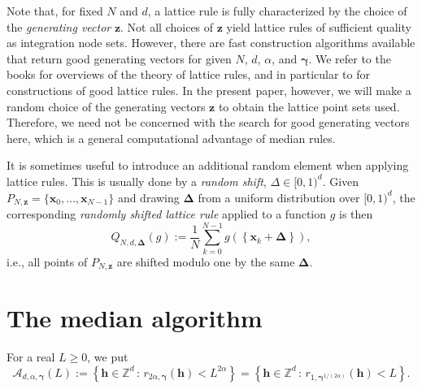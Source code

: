 \documentclass[a4paper,11pt]{article}
\newcommand{\bsh}{\boldsymbol{h}}
\newcommand{\bsx}{\boldsymbol{x}}
\newcommand{\bsz}{\boldsymbol{z}}
\newcommand{\bsgamma}{\boldsymbol{\gamma}}
\newcommand{\bsDelta}{\boldsymbol{\Delta}}
\newcommand{\ZZ}{\mathbb{Z}}
\newcommand{\Acal}{\mathcal{A}}
\begin{document}
Note that, for fixed $N$ and $d$, a lattice rule is fully characterized by the choice of the \textit{generating vector} $\bsz$. Not all choices of $\bsz$ yield lattice rules of sufficient quality as integration node sets. However, there are fast construction algorithms available that return good generating vectors for given $N$, $d$, $\alpha$, and $\bsgamma$. We refer to the books \cite{DKP22, SJ94} for overviews of the theory of lattice rules, and in particular to \cite[Chapters 3 and 4]{DKP22} for constructions of good lattice rules. In the present paper, however, we will make a random choice of the generating vectors $\bsz$ to obtain the lattice point sets used. Therefore, we need not be concerned with the search for good generating vectors here, which is a general computational advantage of median rules. 

It is sometimes useful to introduce an additional random element when applying lattice rules. This is usually done by a \emph{random shift}, $\Delta\in [0,1)^d$. Given $P_{N,\bsz}=\{\bsx_0,\ldots,\bsx_{N-1}\}$ and drawing $\bsDelta$ from a uniform distribution over $[0,1)^d$, the corresponding \emph{randomly shifted lattice rule} applied to a function $g$ is then 
\[
   Q_{N,d,\bsDelta}(g):=\frac{1}{N}\sum_{k=0}^{N-1}g \left(\left\{\bsx_k + \bsDelta\right\}\right),
\]
i.e., all points of $P_{N,\bsz}$ are shifted modulo one by the same $\bsDelta$.


\section{The median algorithm}\label{sec:median}

For a real $L\geq 0$, we put 
\begin{equation}\label{eq:Acal}
\Acal_{d,\alpha,\bsgamma}(L) := \left\{ \bsh \in \ZZ^d \,:\,  r_{2\alpha, \bsgamma}(\bsh) < L^{2\alpha} \right\}=\left\{ \bsh \in \ZZ^d \,:\,  r_{1, \bsgamma^{1/(2\alpha)}}(\bsh) < L\right\}.
\end{equation}
\end{document}
